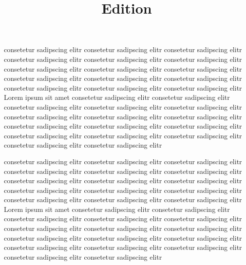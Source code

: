 \documentclass[]{book}
\begin{document}
\title{Edition}
\begin{pages}
    \begin{Leftside}
        \beginnumbering
        \pstart\startsub
         {}
       consetetur sadipscing elitr
       consetetur sadipscing elitr
       consetetur sadipscing elitr
       consetetur sadipscing elitr
       consetetur sadipscing elitr
       consetetur sadipscing elitr
       consetetur sadipscing elitr
       consetetur sadipscing elitr
       consetetur sadipscing elitr
       consetetur sadipscing elitr
       consetetur sadipscing elitr
       consetetur sadipscing elitr
       consetetur sadipscing elitr
       consetetur sadipscing elitr
       consetetur sadipscing elitr
        \endsub\pend
        \pstart
       Lorem ipsum {} sit amet
       consetetur sadipscing elitr
       consetetur sadipscing elitr
       consetetur sadipscing elitr
       consetetur sadipscing elitr
       consetetur sadipscing elitr
       consetetur sadipscing elitr
       consetetur sadipscing elitr
       consetetur sadipscing elitr
       consetetur sadipscing elitr
       consetetur sadipscing elitr
       consetetur sadipscing elitr
       consetetur sadipscing elitr
       consetetur sadipscing elitr
       consetetur sadipscing elitr
       consetetur sadipscing elitr
       consetetur sadipscing elitr
       \pend
       \endnumbering
    \end{Leftside}
    \begin{Rightside}
        \beginnumbering
        \pstart\startsub
         {}
       consetetur sadipscing elitr
       consetetur sadipscing elitr
       consetetur sadipscing elitr
       consetetur sadipscing elitr
       consetetur sadipscing elitr
       consetetur sadipscing elitr
       consetetur sadipscing elitr
       consetetur sadipscing elitr
       consetetur sadipscing elitr
       consetetur sadipscing elitr
       consetetur sadipscing elitr
       consetetur sadipscing elitr
       consetetur sadipscing elitr
       consetetur sadipscing elitr
       consetetur sadipscing elitr
        \endsub\pend
        \pstart
       Lorem ipsum  {} sit amet
       consetetur sadipscing elitr
       consetetur sadipscing elitr
       consetetur sadipscing elitr
       consetetur sadipscing elitr
       consetetur sadipscing elitr
       consetetur sadipscing elitr
       consetetur sadipscing elitr
       consetetur sadipscing elitr
       consetetur sadipscing elitr
       consetetur sadipscing elitr
       consetetur sadipscing elitr
       consetetur sadipscing elitr
       consetetur sadipscing elitr
       consetetur sadipscing elitr
       consetetur sadipscing elitr
       consetetur sadipscing elitr
       \pend
        \endnumbering
    \end{Rightside}
\end{pages}
\Pages
\end{document}
